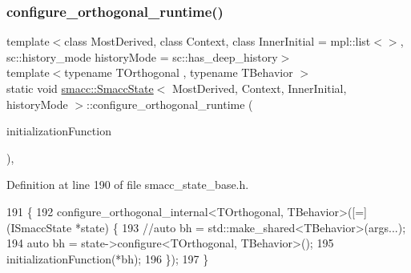 \subsubsection{\texorpdfstring{configure\+\_\+orthogonal\+\_\+runtime()}{configure\_orthogonal\_runtime()}\hspace{0.1cm}{\footnotesize\ttfamily [2/2]}}
{\footnotesize\ttfamily template$<$class Most\+Derived, class Context, class Inner\+Initial = mpl\+::list$<$$>$, sc\+::history\+\_\+mode history\+Mode = sc\+::has\+\_\+deep\+\_\+history$>$ \\
template$<$typename T\+Orthogonal , typename T\+Behavior $>$ \\
static void \hyperlink{classsmacc_1_1SmaccState}{smacc\+::\+Smacc\+State}$<$ Most\+Derived, Context, Inner\+Initial, history\+Mode $>$\+::configure\+\_\+orthogonal\+\_\+runtime (\begin{DoxyParamCaption}\item[{std\+::function$<$ void(T\+Behavior \&bh)$>$}]{initialization\+Function }\end{DoxyParamCaption})\hspace{0.3cm}{\ttfamily [inline]}, {\ttfamily [static]}}



Definition at line 190 of file smacc\+\_\+state\+\_\+base.\+h.


\begin{DoxyCode}
191     \{
192       configure\_orthogonal\_internal<TOrthogonal, TBehavior>([=](ISmaccState *state) \{
193         \textcolor{comment}{//auto bh = std::make\_shared<TBehavior>(args...);}
194         \textcolor{keyword}{auto} bh = state->configure<TOrthogonal, TBehavior>();
195         initializationFunction(*bh);
196       \});
197     \}
\end{DoxyCode}
\mbox{\label{classsmacc_1_1SmaccState_aac23d8a6909f75c5e5fca2a7c09b5368}} 
